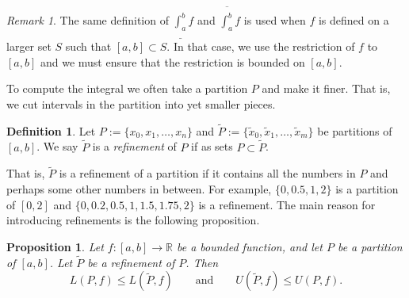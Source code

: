\documentclass[12pt]{book}
\newcommand{\R}{{\mathbb{R}}}
\theoremstyle{plain}
\newtheorem{prop}[thm]{Proposition}
\theoremstyle{remark}
\newtheorem{remark}[thm]{Remark}
\theoremstyle{definition}
\newtheorem{defn}[thm]{Definition}
\theoremstyle{exercise}
\theoremstyle{example}
\begin{document}
\begin{remark}
The same definition of $\underline{\int_a^b} f$ and
$\overline{\int_a^b} f$
is used when $f$ is defined on a larger set $S$ such that
$[a,b] \subset S$.  In that case, we use the restriction of $f$ to $[a,b]$
and we must ensure that the restriction is bounded on $[a,b]$.
\end{remark}

To compute the integral we often take a partition $P$ and make it finer.
That is, we cut intervals in the partition into yet smaller pieces.

\begin{defn}
Let $P := \{ x_0, x_1, \ldots, x_n \}$ and
$\widetilde{P} := \{ \widetilde{x}_0, \widetilde{x}_1, \ldots, \widetilde{x}_m \}$ be
partitions of $[a,b]$.  We say $\widetilde{P}$ is a
\emph{refinement} of $P$
if as sets $P \subset \widetilde{P}$.
\end{defn}

That is, $\widetilde{P}$ is a refinement of a partition if it contains all the
numbers in $P$ and perhaps some other numbers in between.  For example,
$\{ 0, 0.5, 1, 2 \}$ is a partition of $[0,2]$ and
$\{ 0, 0.2, 0.5, 1, 1.5, 1.75, 2 \}$ is a refinement.
The main reason for introducing refinements is the following proposition.

\begin{prop} \label{prop:refinement}
Let $f \colon [a,b] \to \R$ be a bounded function, and let $P$
be a partition of $[a,b]$.  Let $\widetilde{P}$ be a refinement of $P$.
Then
\begin{equation*}
L(P,f) \leq L(\widetilde{P},f) 
\qquad \text{and} \qquad
U(\widetilde{P},f) \leq U(P,f) .
\end{equation*}
\end{prop}
\end{document}
